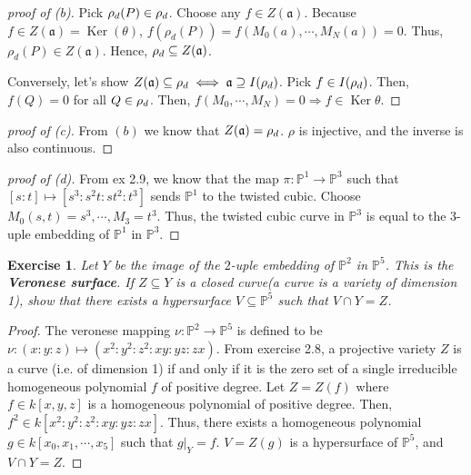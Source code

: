 \documentclass[12pt,letterpaper]{article}
\newtheorem{problem}{Exercise}[section]
\theoremstyle{definition}
\theoremstyle{remark}
\numberwithin{equation}{section}
\numberwithin{figure}{problem}
\let\Im\relax
\DeclareMathOperator{\Im}{im}
\DeclareMathOperator{\Ker}{Ker}
\newcommand{\PP}{\mathbb{P}}
\begin{document}
\begin{proof}[proof of (b)]
Pick $\rho_d(P) \in \Im \rho_d$. Choose any $f \in Z(\mathfrak{a})$. Because $f \in Z(\mathfrak{a}) = \Ker(\theta)$, $f(\rho_d(P)) = f(M_0(a), \cdots, M_N(a)) = 0$. Thus, $\rho_d(P) \in Z(\mathfrak{a})$. Hence, $\Im \rho_d \subseteq  Z(\mathfrak{a})$. 

Conversely, let's show $Z(\mathfrak{a}) \subseteq \Im \rho_d \iff \mathfrak{a} \supseteq I(\Im \rho_d)$. Pick $f \in I(\Im \rho_d)$. Then, $f(Q) = 0$ for all $Q \in \Im \rho_d$. Then, $f(M_0, \cdots, M_N)= 0 \Rightarrow f \in \Ker \theta$. 
\end{proof}

\begin{proof}[proof of (c)]
From $(b)$ we know that $Z(\mathfrak{a}) = \Im \rho_d$. $\rho$ is injective, and the inverse is also continuous.  
\end{proof}

\begin{proof}[proof of (d)] From ex 2.9, we know that the map $\pi: \PP^1 \to \PP^3$ such that $[s:t] \mapsto [s^3: s^2t: st^2: t^3]$ sends $\PP^1$ to the twisted cubic. Choose $M_0(s,t) = s^3, \cdots, M_3 = t^3$. Thus, the twisted cubic curve in $\PP^3$ is equal to the $3$-uple embedding of $\PP^1$ in $\PP^3$. 

\end{proof}


\begin{problem} Let $Y$ be the image of the $2$-uple embedding of $\PP^2$ in $\PP^5$. This is the \textbf{Veronese surface}. If $Z \subseteq Y$ is a closed curve(a curve is a variety of dimension 1), show that there exists a hypersurface $V \subseteq \PP^5$ such that $V \cap Y = Z$. 
\end{problem}

\begin{proof}
The veronese mapping $\nu: \PP^2 \to \PP^5$ is defined to be $\nu: (x:y:z) \mapsto (x^2: y^2:z^2:xy:yz:zx)$. From exercise 2.8, a projective variety $Z$ is a curve (i.e. of dimension 1) if and only if it is the zero set of a single irreducible homogeneous polynomial $f$ of positive degree. Let $Z = Z(f)$ where $f \in k[x,y,z]$ is a homogeneous polynomial of positive degree. Then, $f^2 \in k[x^2:y^2:z^2:xy:yz:zx]$. Thus, there exists a homogeneous polynomial $g \in k[x_0, x_1, \cdots, x_5]$ such that $g|_Y = f$. $V = Z(g)$ is a hypersurface of $\PP^5$, and $V \cap Y = Z$. 
\end{proof}
\end{document}
